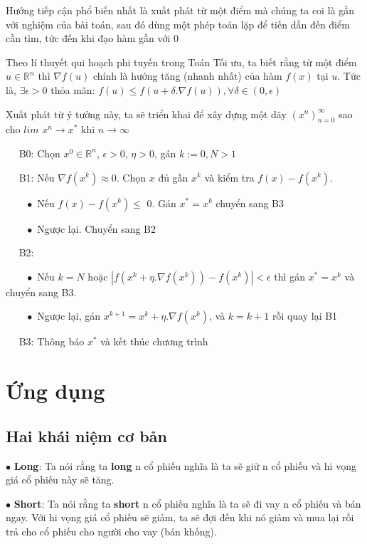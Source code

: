 \documentclass[14pt]{extreport}
\begin{document}
Hướng tiếp cận phổ biến nhất là xuất phát từ một điểm mà chúng ta coi là gần với nghiệm của bài toán, sau đó dùng một phép toán lặp để tiến dần đến điểm cần tìm, tức đến khi đạo hàm gần với 0

Theo lí thuyết qui hoạch phi tuyến trong Toán Tối ưu, ta biết rằng từ một điểm $u \in \mathbb{R}^n$ thì $\nabla f(u)$ chính là hướng tăng (nhanh nhất) của hàm $f(x)$ tại $u$. Tức là, $\exists \epsilon >0$ thỏa mãn: $f(u) \leq f(u+\delta. \nabla f(u)), \forall \delta \in (0, \epsilon)$

Xuất phát từ ý tưởng này, ta sẽ triển khai để xây dựng một dãy $(x^n)_{n=0}^{\infty}$ sao cho $lim$ $ x^n \rightarrow x^*$ khi $n \rightarrow \infty$

$\quad$ B0: Chọn $x^0 \in \mathbb{R}^n$, $\epsilon >0$, $\eta > 0$, gán $k := 0, N > 1$

$\quad$ B1: Nếu $\nabla f(x^k) \approx 0$. Chọn $x$ đủ gần $x^k$ và kiểm tra $f(x) - f(x^k)$.
 
$\quad \quad \bullet$ Nếu $f(x) - f(x^k) \leq$   0. Gán $x^* = x^k$ chuyển sang B3

$\quad \quad \bullet$ Ngược lại. Chuyển sang B2

$\quad$ B2: 

$\quad \quad \bullet$ Nếu $k = N$ hoặc $|f(x^k + \eta.\nabla f(x^k)) - f(x^k)| < \epsilon$ thì gán $x^* = x^k$ và chuyển sang B3.

$\quad \quad \bullet$ Ngược lại, gán $x^{k+1} = x^k + \eta.\nabla f(x^k)$, và $k = k+1$ rồi quay lại B1

$\quad$ B3: Thông báo $x^*$ và kết thúc chương trình



\chapter{Ứng dụng}

\section{Hai khái niệm cơ bản}

\hspace{0.55cm} $ \bullet$ \textbf{Long}: Ta nói rằng ta \textbf{long} n cổ phiếu nghĩa là ta sẽ giữ n cổ phiếu và hi vọng giá cổ phiếu này sẽ tăng.

$\bullet$ \textbf{Short}: Ta nói rằng ta \textbf{short} n cổ phiếu nghĩa là ta sẽ đi vay n cổ phiếu và bán ngay. Với hi vọng giá cổ phiếu sẽ giảm, ta sẽ đợi đến khi nó giảm và mua lại rồi trả cho cổ phiếu cho người cho vay  (bán khống).
\end{document}
